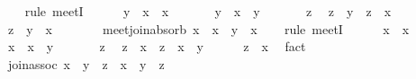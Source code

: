 \begin{isabellebody}
\ \ \isamarkupfalse%
\ {\isacharparenleft}rule\ meetI{\isacharparenright}\isanewline
\ \ \ \ \isamarkupfalse%
\ {\isachardoublequoteopen}y\ {\isasymsqinter}\ x\ {\isasymsqsubseteq}\ x{\isachardoublequoteclose}\ \isacommand{{\isachardot}{\isachardot}}\isamarkupfalse%
\isanewline
\ \ \ \ \isamarkupfalse%
\ {\isachardoublequoteopen}y\ {\isasymsqinter}\ x\ {\isasymsqsubseteq}\ y{\isachardoublequoteclose}\ \isacommand{{\isachardot}{\isachardot}}\isamarkupfalse%
\isanewline
\ \ \ \ \isamarkupfalse%
\ z\ \isamarkupfalse%
\ {\isachardoublequoteopen}z\ {\isasymsqsubseteq}\ y{\isachardoublequoteclose}\ \ {\isachardoublequoteopen}z\ {\isasymsqsubseteq}\ x{\isachardoublequoteclose}\isanewline
\ \ \ \ \isamarkupfalse%
\ \isamarkupfalse%
\ {\isachardoublequoteopen}z\ {\isasymsqsubseteq}\ y\ {\isasymsqinter}\ x{\isachardoublequoteclose}\ \isacommand{{\isachardot}{\isachardot}}\isamarkupfalse%
\isanewline
\ \ \isamarkupfalse%
\isanewline
\isanewline
\ \ \isamarkupfalse%
\ meet{\isacharunderscore}join{\isacharunderscore}absorb{\isacharcolon}\ {\isachardoublequoteopen}x\ {\isasymsqinter}\ {\isacharparenleft}x\ {\isasymsqunion}\ y{\isacharparenright}\ {\isacharequal}\ x{\isachardoublequoteclose}\isanewline
\ \ \isamarkupfalse%
\ {\isacharparenleft}rule\ meetI{\isacharparenright}\isanewline
\ \ \ \ \isamarkupfalse%
\ {\isachardoublequoteopen}x\ {\isasymsqsubseteq}\ x{\isachardoublequoteclose}\ \isacommand{{\isachardot}{\isachardot}}\isamarkupfalse%
\isanewline
\ \ \ \ \isamarkupfalse%
\ {\isachardoublequoteopen}x\ {\isasymsqsubseteq}\ x\ {\isasymsqunion}\ y{\isachardoublequoteclose}\ \isacommand{{\isachardot}{\isachardot}}\isamarkupfalse%
\isanewline
\ \ \ \ \isamarkupfalse%
\ z\ \isamarkupfalse%
\ {\isachardoublequoteopen}z\ {\isasymsqsubseteq}\ x{\isachardoublequoteclose}\ \ {\isachardoublequoteopen}z\ {\isasymsqsubseteq}\ x\ {\isasymsqunion}\ y{\isachardoublequoteclose}\isanewline
\ \ \ \ \isamarkupfalse%
\ {\isachardoublequoteopen}z\ {\isasymsqsubseteq}\ x{\isachardoublequoteclose}\ \isamarkupfalse%
\ fact\isanewline
\ \ \isamarkupfalse%
\isanewline
\isanewline
\ \ \isamarkupfalse%
\ join{\isacharunderscore}assoc{\isacharcolon}\ {\isachardoublequoteopen}{\isacharparenleft}x\ {\isasymsqunion}\ y{\isacharparenright}\ {\isasymsqunion}\ z\ {\isacharequal}\ x\ {\isasymsqunion}\ {\isacharparenleft}y\ {\isasymsqunion}\ z{\isacharparenright}{\isachardoublequoteclose}\isanewline

\end{isabellebody}
